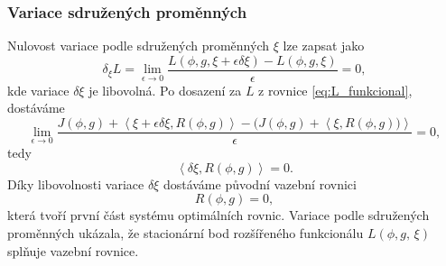 \subsubsection{Variace sdružených proměnných}
Nulovost variace podle sdružených proměnných $ \xi $ lze zapsat jako
\begin{equation*}
\delta_\xi L = \lim\limits_{\epsilon\rightarrow0}\dfrac{L(\phi,g,\xi+\epsilon\delta\xi)-L(\phi,g,\xi)}{\epsilon}=0,
\end{equation*}
kde variace $ \delta\xi $ je libovolná. Po dosazení za $ L $ z rovnice \ref{eq:L_funkcional}, dostáváme
\begin{equation*}
\lim\limits_{\epsilon\rightarrow0} \dfrac
{J(\phi, g) +  \left\langle\xi+\epsilon\delta\xi, R(\phi, g)\right\rangle - (J(\phi, g) +   \left\langle\xi , R(\phi, g))\right\rangle }
{\epsilon}
=0,
\end{equation*}
tedy 
\begin{equation*}
 \left\langle\delta\xi , R(\phi, g) \right\rangle = 0.
\end{equation*}
Díky libovolnosti variace $ \delta\xi $ dostáváme původní vazební rovnici 
\begin{equation}\label{eq:vazebni_rce}
R(\phi, g)=0,
\end{equation}
která tvoří první část systému optimálních rovnic. Variace podle sdružených proměnných ukázala, že stacionární bod rozšířeného funkcionálu $ L(\phi, g,\,\xi)  $ splňuje vazební rovnice\cite{karman1997inverse}.

